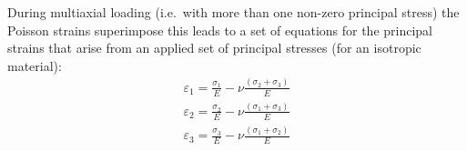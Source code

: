 During multiaxial loading (i.e.\ with more than one non-zero principal stress) the Poisson strains superimpose this leads to a set of equations for the principal strains that arise from an applied set of principal stresses (for an isotropic material):
\begin{align}
\varepsilon_1 = \frac{\sigma_1}{E} - \nu \frac{(\sigma_2 + \sigma_3)}{E} \nonumber\\
\varepsilon_2 = \frac{\sigma_2}{E} - \nu \frac{(\sigma_1 + \sigma_3)}{E}  \label{eqn:constitutive_laws}\\
\varepsilon_3 = \frac{\sigma_3}{E} - \nu \frac{(\sigma_1 + \sigma_2)}{E} \nonumber 
\end{align}
































































